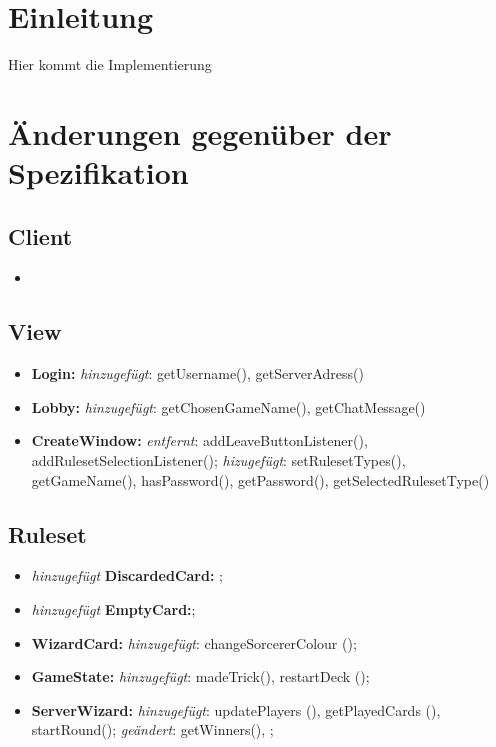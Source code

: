 \documentclass{article}
\begin{document}
\tableofcontents
\newpage

\section{Einleitung}
Hier kommt die Implementierung

\newpage

\section{Änderungen gegenüber der Spezifikation}

\subsection{Client}

\begin{itemize}
\item 
\end{itemize}

\subsection{View}

\begin{itemize}
\item \textbf{Login:} \textit{hinzugefügt}: getUsername(), getServerAdress()
\item \textbf{Lobby:} \textit{hinzugefügt}: getChosenGameName(), getChatMessage()
\item \textbf{CreateWindow:} \textit{entfernt}: addLeaveButtonListener(), addRulesetSelectionListener(); \textit{hizugefügt}: setRulesetTypes(), getGameName(), hasPassword(), getPassword(), getSelectedRulesetType()
\end{itemize}

\subsection{Ruleset}

\begin{itemize}
\item \textit{hinzugefügt} \textbf{DiscardedCard:} ;

\item \textit{hinzugefügt} \textbf{EmptyCard:};

\item \textbf{WizardCard:} \textit{hinzugefügt}: changeSorcererColour ();

\item \textbf{GameState:} \textit{hinzugefügt}: madeTrick(), restartDeck ();

\item \textbf{ServerWizard:} \textit{hinzugefügt}: updatePlayers (), getPlayedCards (),
startRound(); 
\textit{geändert}: getWinners(),  ;
\end{itemize}
\end{document}
